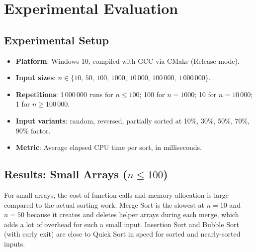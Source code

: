 \documentclass[12pt,a4paper]{article}
\theoremstyle{definition}
\begin{document}
\section{Experimental Evaluation}
\label{sec:experiments}

\subsection{Experimental Setup}

\begin{itemize}[noitemsep]
  \item \textbf{Platform}: Windows 10, compiled with GCC via CMake (Release mode).
  \item \textbf{Input sizes}: $n \in \{10,\, 50,\, 100,\, 1000,\, 10\,000,\, 100\,000,\, 1\,000\,000\}$.
  \item \textbf{Repetitions}: 1\,000\,000 runs for $n \leq 100$; 100 for $n=1000$; 10 for $n=10\,000$; 1 for $n \geq 100\,000$.
  \item \textbf{Input variants}: random, reversed, partially sorted at 10\%, 30\%, 50\%, 70\%, 90\% factor.
  \item \textbf{Metric}: Average elapsed CPU time per sort, in milliseconds.
\end{itemize}

\subsection{Results: Small Arrays ($n \leq 100$)}

For small arrays, the cost of function calls and memory allocation is large compared to the actual sorting work. Merge Sort is the slowest at $n=10$ and $n=50$ because it creates and deletes helper arrays during each merge, which adds a lot of overhead for such a small input. Insertion Sort and Bubble Sort (with early exit) are close to Quick Sort in speed for sorted and nearly-sorted inputs.
\end{document}
